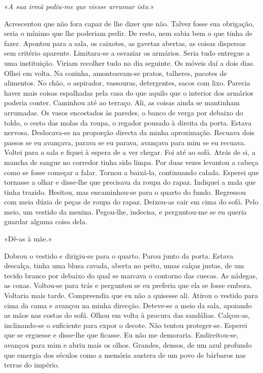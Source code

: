 «\emph{A sua irmã pediu­‑me que viesse arrumar isto.}»

Acrescentou que não fora capaz de lhe dizer que não. Talvez fosse sua
obrigação, seria o mínimo que lhe poderiam pedir. De resto, nem sabia
bem o que tinha de fazer. Apontou para a sala, os caixotes, as gavetas
abertas, as coisas dispersas sem critério aparente. Limitara­‑se a
esvaziar os armários. Seria tudo entregue a uma instituição. Viriam
recolher tudo no dia seguinte. Os móveis daí a dois dias. Olhei em
volta. Na cozinha, amontoavam­‑se pratos, talheres, pacotes de
alimentos. No chão, o aspirador, vassouras, detergentes, sacos com lixo.
Parecia haver mais coisas espalhadas pela casa do que aquilo que o
interior dos armários poderia conter. Caminhou até ao terraço. Ali, as
coisas ainda se mantinham arrumadas. Os vasos encostados às paredes, o
banco de verga por debaixo do toldo, o cesto das molas da roupa, o
regador pousado à direita da porta. Estava nervosa. Deslocava­‑se na
proporção directa da minha aproximação. Recuava dois passos se eu
avançava, parava se eu parava, avançava para mim se eu recuava. Voltei
para a sala e fiquei à espera de a ver chegar. Foi até ao sofá. Atrás de
si, a mancha de sangue no corredor tinha sido limpa. Por duas vezes
levantou a cabeça como se fosse começar a falar. Tornou a baixá­‑la,
continuando calada. Esperei que tornasse a olhar e disse­‑lhe que
precisava da roupa do rapaz. Indiquei a mala que tinha trazido. Hesitou,
mas encaminhou­‑se para o quarto do fundo. Regressou com meia dúzia de
peças de roupa do rapaz. Deixou­‑as cair em cima do sofá. Pelo meio, um
vestido da menina. Pegou­‑lhe, indecisa, e perguntou­‑me se eu queria
guardar alguma coisa dela.

«Dê­‑as à mãe.»

Dobrou o vestido e dirigiu­‑se para o quarto. Parou junto da porta.
Estava descalça, tinha uma blusa cavada, aberta no peito, umas calças
justas, de um tecido branco por debaixo do qual se marcava o contorno
das cuecas. As nádegas, as coxas. Voltou­‑se para trás e perguntou se eu
preferia que ela se fosse embora. Voltaria mais tarde. Compreendia que
eu não a quisesse ali. Atirou o vestido para cima da cama e avançou na
minha direcção. Deteve­‑se a meio da sala, apoiando as mãos nas costas
do sofá. Olhou em volta à procura das sandálias. Calçou­‑as,
inclinando­‑se o suficiente para expor o decote. Não tentou
proteger­‑se. Esperei que se erguesse e disse­‑lhe que ficasse. Eu não
me demoraria. Endireitou­‑se, avançou para mim e abriu mais os olhos.
Grandes, densos, de um azul profundo que emergia dos séculos como a
memória austera de um povo de bárbaros nas terras do império.

